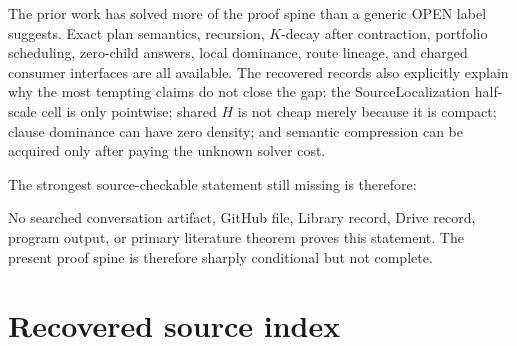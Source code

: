 \documentclass[10pt]{article}
\begin{document}
The prior work has solved more of the proof spine than a generic OPEN label
suggests.  Exact plan semantics, recursion, $K$-decay after contraction,
portfolio scheduling, zero-child answers, local dominance, route lineage,
and charged consumer interfaces are all available.  The recovered records
also explicitly explain why the most tempting claims do not close the gap:
the SourceLocalization half-scale cell is only pointwise; shared $H$ is not
cheap merely because it is compact; clause dominance can have zero density;
and semantic compression can be acquired only after paying the unknown solver
cost.

The strongest source-checkable statement still missing is therefore:
\begin{center}
\end{center}
No searched conversation artifact, GitHub file, Library record, Drive record,
program output, or primary literature theorem proves this statement.  The
present proof spine is therefore sharply conditional but not complete.

\section*{Recovered source index}
\end{document}
